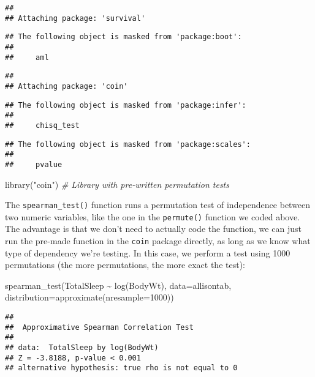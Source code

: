 \documentclass[
]{book}
\newenvironment{Shaded}{\begin{snugshade}}{\end{snugshade}}
\newcommand{\AttributeTok}[1]{\textcolor[rgb]{0.77,0.63,0.00}{#1}}
\newcommand{\CommentTok}[1]{\textcolor[rgb]{0.56,0.35,0.01}{\textit{#1}}}
\newcommand{\DecValTok}[1]{\textcolor[rgb]{0.00,0.00,0.81}{#1}}
\newcommand{\FunctionTok}[1]{\textcolor[rgb]{0.00,0.00,0.00}{#1}}
\newcommand{\NormalTok}[1]{#1}
\newcommand{\SpecialCharTok}[1]{\textcolor[rgb]{0.00,0.00,0.00}{#1}}
\newcommand{\StringTok}[1]{\textcolor[rgb]{0.31,0.60,0.02}{#1}}
\begin{document}
\begin{verbatim}
## 
## Attaching package: 'survival'
\end{verbatim}

\begin{verbatim}
## The following object is masked from 'package:boot':
## 
##     aml
\end{verbatim}

\begin{verbatim}
## 
## Attaching package: 'coin'
\end{verbatim}

\begin{verbatim}
## The following object is masked from 'package:infer':
## 
##     chisq_test
\end{verbatim}

\begin{verbatim}
## The following object is masked from 'package:scales':
## 
##     pvalue
\end{verbatim}

\begin{Shaded}
\begin{Highlighting}[]
\FunctionTok{library}\NormalTok{(}\StringTok{"coin"}\NormalTok{) }\CommentTok{\# Library with pre{-}written permutation tests}
\end{Highlighting}
\end{Shaded}

The \texttt{spearman\_test()} function runs a permutation test of independence between two numeric variables, like the one in the \texttt{permute()} function we coded above. The advantage is that we don't need to actually code the function, we can just run the pre-made function in the \texttt{coin} package directly, as long as we know what type of dependency we're testing. In this case, we perform a test using 1000 permutations (the more permutations, the more exact the test):

\begin{Shaded}
\begin{Highlighting}[]
\FunctionTok{spearman\_test}\NormalTok{(TotalSleep }\SpecialCharTok{\textasciitilde{}} \FunctionTok{log}\NormalTok{(BodyWt), }\AttributeTok{data=}\NormalTok{allisontab, }\AttributeTok{distribution=}\FunctionTok{approximate}\NormalTok{(}\AttributeTok{nresample=}\DecValTok{1000}\NormalTok{)) }
\end{Highlighting}
\end{Shaded}

\begin{verbatim}
## 
##  Approximative Spearman Correlation Test
## 
## data:  TotalSleep by log(BodyWt)
## Z = -3.8188, p-value < 0.001
## alternative hypothesis: true rho is not equal to 0
\end{verbatim}
\end{document}
